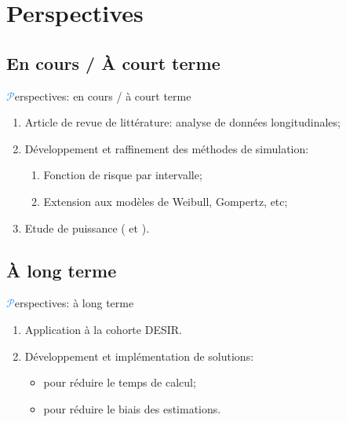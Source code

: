 \section{Perspectives}
\subsection{En cours / À court terme}
\begin{frame}{{\huge\textcolor{dodgerblue}{$\mathcal{P}$}}erspectives: en cours / à court terme}
\par{%
\begin{enumerate}
    \item \textcolor{springgreen3}{Article de revue de littérature}: analyse de données longitudinales;
    \vspace{1em}
    \item \textcolor{springgreen3}{Développement} et \textcolor{springgreen3}{raffinement} des méthodes de simulation:
    \vspace{1em}
    \begin{enumerate}
        \item Fonction de risque par intervalle;
        \vspace{1em}
        \item Extension aux modèles de Weibull, Gompertz, etc;
    \end{enumerate}
    \vspace{1em}
    \item \textcolor{springgreen3}{Etude de puissance} ( et ).
\end{enumerate}
}
\end{frame}

\subsection{À long terme}
\begin{frame}{{\huge\textcolor{dodgerblue}{$\mathcal{P}$}}erspectives: à long terme}
\par{
\begin{enumerate}
    \item \textcolor{springgreen3}{Application} à la cohorte DESIR.
    \vspace{1em}
    \item \textcolor{springgreen3}{Développement} et \textcolor{springgreen3}{implémentation} de solutions:
    \vspace{1em}
    \begin{itemize}
        \item pour réduire le temps de calcul;
        \vspace{1em}
        \item pour réduire le biais des estimations.
    \end{itemize}
\end{enumerate}
}
\end{frame}


